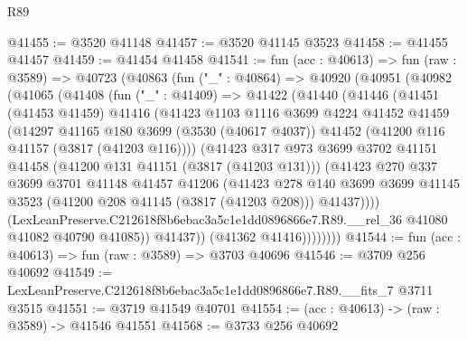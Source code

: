 \begin{lexlean}{R89}
\begin{coremodule}
@41455 := @3520 @41148
@41457 := @3520 @41145 @3523
@41458 := @41455 @41457
@41459 := @41454 @41458
@41541 := fun (acc : @40613) =>
  fun (raw : @3589) =>
  @40723
    (@40863
      (fun ("_" : @40864) =>
      @40920
        (@40951
          (@40982
            (@41065
              (@41408
                (fun ("_" : @41409) =>
                @41422
                  (@41440
                    (@41446
                      (@41451
                        (@41453 @41459)
                        @41416
                        (@41423
                          @1103
                          @1116
                          @3699
                          @4224
                          @41452
                          @41459
                          (@14297
                            @41165
                            @180
                            @3699
                            (@3530 (@40617 @4037))
                            @41452
                            (@41200 @116 @41157 (@3817 (@41203 @116))))
                          (@41423
                            @317
                            @973
                            @3699
                            @3702
                            @41151
                            @41458
                            (@41200 @131 @41151 (@3817 (@41203 @131)))
                            (@41423
                              @270
                              @337
                              @3699
                              @3701
                              @41148
                              @41457
                              @41206
                              (@41423
                                @278
                                @140
                                @3699
                                @3699
                                @41145
                                @3523
                                (@41200 @208 @41145 (@3817 (@41203 @208)))
                                @41437))))
                        (LexLeanPreserve.C212618f8b6ebac3a5c1e1dd0896866e7.R89.__rel_36
                          @41080
                          @41082
                          @40790
                          @41085))
                      @41437))
                  (@41362 @41416))))))))
@41544 := fun (acc : @40613) => fun (raw : @3589) => @3703 @40696
@41546 := @3709 @256 @40692
@41549 := LexLeanPreserve.C212618f8b6ebac3a5c1e1dd0896866e7.R89.__fits_7 @3711 @3515
@41551 := @3719 @41549 @40701
@41554 := (acc : @40613) -> (raw : @3589) -> @41546 @41551
@41568 := @3733
    @256
    @40692

\end{coremodule}
\end{lexlean}
